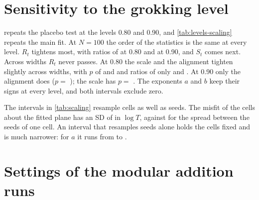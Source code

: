 \documentclass[a4paper,11pt]{article} %
\begin{document}
\section{Sensitivity to the grokking level}\label{app:levels}

 repeats the placebo test at the levels 0.80 and
0.90, and \cref{tab:levels-scaling} repeats the main fit. At $N=100$
the order of
the statistics is the same at every level. $R_t$ tightens most, with ratios of
\EsixteenEightyNhundredRRatio{} at 0.80 and \EsixteenNinetyNhundredRRatio{} at
0.90, and $S_t$ comes next. Across widths $R_t$ never passes. At 0.80 the
scale and the alignment tighten slightly across widths, with $p$ of
\EsixteenEightyAoneSP{} and \EsixteenEightyAoneAP{} and ratios of only
\EsixteenEightyAoneSRatio{} and \EsixteenEightyAoneARatio. At 0.90 only the
alignment does ($p=$ \EsixteenNinetyAoneAP); the scale has $p=$
\EsixteenNinetyAoneSP. The exponents $a$ and
$b$ keep their signs at every level, and both intervals exclude zero.

\begin{table}[htbp]
  \centering\footnotesize
  \caption{The placebo test of \cref{tab:thresholds} at three grokking levels.
  The number of runs that grok is in brackets.}
  \label{tab:levels-thresholds}
  
\end{table}

\begin{table}[htbp]
  \centering\footnotesize
  \caption{The main fit of \cref{tab:scaling} at three grokking levels, with
  intervals that resample cells and seeds.}
  \label{tab:levels-scaling}
  
\end{table}

The intervals in \cref{tab:scaling} resample cells as well as seeds. The
misfit of the cells about the fitted plane has an SD of \EsixMainMisfit{} in
$\log T$, against \EsixMainWithin{} for the spread between the seeds of one
cell. An interval that resamples seeds alone holds the cells fixed and is much
narrower: for $a$ it runs from \EsixMainASeedlo{} to \EsixMainASeedhi.

\section{Settings of the modular addition runs}\label{app:settings}
\end{document}
